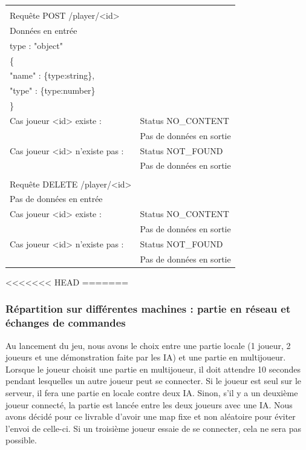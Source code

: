 \documentclass[12pt,a4paper]{article}
\begin{document}
\begin{longtable}{ll}
   & & \\
    
   Requête POST /player/<id> &  \\
   \hline
   \hline
   Données en entrée &  \\
   \hline
    type : "object" & \\
   \{ & \\
    \hspace{1cm} "name" : \{type:string\}, & \\
    \hspace{1cm} "type" : \{type:number\} & \\
   \} & \\
   \hline
   Cas joueur <id> existe : & Status NO\_CONTENT \\
   & Pas de données en sortie\\
   \hline
   Cas joueur <id> n'existe pas : & Status NOT\_FOUND \\
   & Pas de données en sortie\\

   & & \\
    
   Requête DELETE /player/<id> &  \\
   \hline
   \hline
   Pas de données en entrée &  \\
   \hline
   Cas joueur <id> existe : & Status NO\_CONTENT \\
   & Pas de données en sortie\\
   \hline
   Cas joueur <id> n'existe pas : & Status NOT\_FOUND \\
   & Pas de données en sortie\\

\end{longtable}

<<<<<<< HEAD
=======
\subsubsection{Répartition sur différentes machines : partie en réseau et échanges de commandes}

Au lancement du jeu, nous avons le choix entre une partie locale (1 joueur, 2 joueurs et une démonstration faite par les IA) et une partie en multijoueur. Lorsque le joueur choisit une partie en multijoueur, il doit attendre 10 secondes pendant lesquelles un autre joueur peut se connecter. Si le joueur est seul sur le serveur, il fera une partie en locale contre deux IA. Sinon, s'il y a un deuxième joueur connecté, la partie est lancée entre les deux joueurs avec une IA. Nous avons décidé pour ce livrable d'avoir une map fixe et non aléatoire pour éviter l'envoi de celle-ci. Si un troisième joueur essaie de se connecter, cela ne sera pas possible.\\
\end{document}
